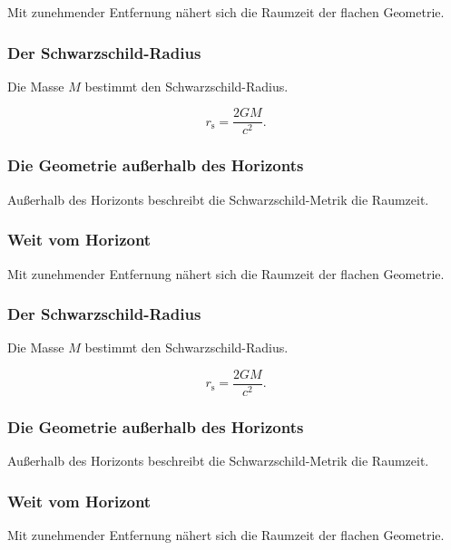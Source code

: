 Mit zunehmender Entfernung nähert sich die Raumzeit der flachen Geometrie.

\begin{frame}[t]
\frametitle{Der Schwarzschild-Radius}

Die Masse $M$ bestimmt den Schwarzschild-Radius.


\par\pause

\[
r_\mathrm{s} = \frac{2GM}{c^2}.
\]

\end{frame}

\begin{frame}[t]
\frametitle{Die Geometrie außerhalb des Horizonts}

Außerhalb des Horizonts beschreibt die Schwarzschild-Metrik die Raumzeit.

\end{frame}

\begin{frame}[t]
\frametitle{Weit vom Horizont}

Mit zunehmender Entfernung nähert sich die Raumzeit der flachen Geometrie.

\end{frame}

\begin{frame}[t]
\frametitle{Der Schwarzschild-Radius}

Die Masse $M$ bestimmt den Schwarzschild-Radius.


\par\pause

\[
r_\mathrm{s} = \frac{2GM}{c^2}.
\]

\end{frame}

\begin{frame}[t]
\frametitle{Die Geometrie außerhalb des Horizonts}

Außerhalb des Horizonts beschreibt die Schwarzschild-Metrik die Raumzeit.

\end{frame}

\begin{frame}[t]
\frametitle{Weit vom Horizont}

Mit zunehmender Entfernung nähert sich die Raumzeit der flachen Geometrie.

\end{frame}

